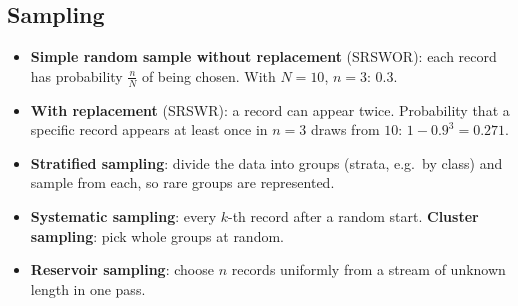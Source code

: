 \documentclass[11pt,a4paper]{article}
\begin{document}
\subsection{Sampling}
\begin{itemize}[noitemsep]
\item \textbf{Simple random sample without replacement} (SRSWOR): each record has probability $\frac nN$ of being chosen. With $N=10$, $n=3$: $0.3$.
\item \textbf{With replacement} (SRSWR): a record can appear twice. Probability that a specific record appears at least once in $n=3$ draws from $10$: $1-0.9^3=0.271$.
\item \textbf{Stratified sampling}: divide the data into groups (strata, e.g.\ by class) and sample from each, so rare groups are represented.
\item \textbf{Systematic sampling}: every $k$-th record after a random start. \textbf{Cluster sampling}: pick whole groups at random.
\item \textbf{Reservoir sampling}: choose $n$ records uniformly from a stream of unknown length in one pass.
\end{itemize}
\end{document}
